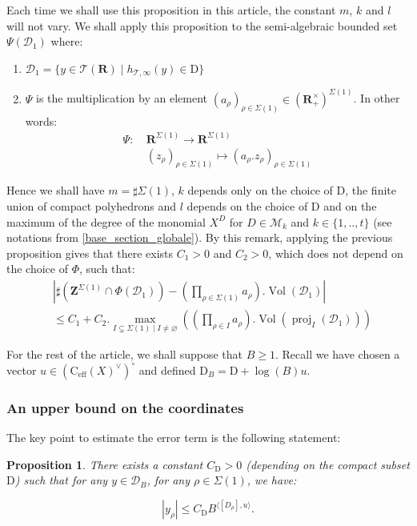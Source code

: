 \documentclass{proc-l}
\newcommand{\R}{\mathbf{R}}
\newcommand{\Z}{\mathbf{Z}}
\newcommand{\cone}{\text{C}_{\text{eff}}(X)}
\DeclareMathOperator{\proj}{proj}
\DeclareMathOperator{\Vol}{Vol}
\newcommand{\stackT}{\mathcal{T}}
\newtheorem{prop}[theorem]{Proposition}
\theoremstyle{definition}
\theoremstyle{remark}
\numberwithin{equation}{section}
\begin{document}
Each time we shall use this proposition in this article, the constant $m$, $k$ and $l$ will not vary. We shall apply this proposition to the semi-algebraic bounded set $\Psi(\mathcal{D}_1)$ where:
\begin{enumerate}
    \item $\mathcal{D}_1 = \{ y \in \stackT(\R) \mid h_{\stackT,\infty}(y) \in \mathrm{D}\} $
    \item $\Psi$ is the multiplication by an element $(a_{\rho})_{\rho \in \Sigma(1)} \in (\R_+^{\times})^{\Sigma(1)}$. In other words:
    \begin{align*}
        \Psi : \ &\R^{\Sigma(1)} \rightarrow \R^{\Sigma(1)} \\
        &(z_{\rho})_{\rho \in \Sigma(1)} \longmapsto \left( a_{\rho} . z_{\rho} \right)_{\rho \in \Sigma(1)}
    \end{align*}
\end{enumerate}Hence  we shall have $m = \sharp \Sigma(1)$, $k$ depends only on the choice of $\mathrm{D}$, the finite union of compact polyhedrons and $l$ depends on the choice of $\mathrm{D}$ and on the maximum of the degree of the monomial $X^D$ for $D \in \mathcal{M}_k$ and $k \in \{1,..,t\}$ (see notations from \ref{base_section_globale}). By this remark, applying the previous proposition gives that there exists $C_1 > 0$ and $C_2 > 0$, which does not depend on the choice of $\Phi$, such that:
\begin{align*}
    &\left| \sharp ( \Z^{\Sigma(1)} \cap \Phi(\mathcal{D}_1) ) - \left(\prod\limits_{\rho \in \Sigma(1)} a_{\rho} \right).\Vol(\mathcal{D}_1) \right| \\
    &\leqslant C_1 + C_2 .\max\limits_{I \subsetneq \Sigma(1) \mid I \neq \varnothing} \left( \left(\prod\limits_{\rho \in I} a_{\rho} \right) . \Vol(\proj_I(\mathcal{D}_1)) \right)
\end{align*}

For the rest of the article, we shall suppose that $B \geqslant 1$. Recall we have chosen a vector $u \in \left(\cone^{\vee}\right)^{\circ}$ and defined $\mathrm{D}_{B} = \mathrm{D} + \log(B) u$. 

\subsubsection{An upper bound on the coordinates}

The key point to estimate the error term is the following statement:

\begin{prop}\label{crucial_majoration}
    There exists a constant $C_{\mathrm{D}} > 0$ (depending on the compact subset $\mathrm{D}$) such that for any $y \in \mathcal{D}_{B}$, for any $\rho \in \Sigma(1)$, we have:
    
    $$ |y_{\rho}| \leqslant C_{\mathrm{D}} B^{ \langle [D_{\rho}],u \rangle } .$$ 
\end{prop}
\end{document}
